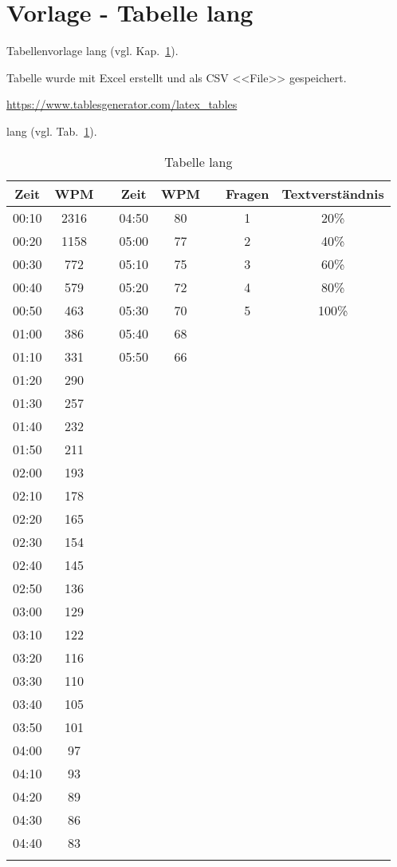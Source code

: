 ﻿\section{Vorlage - Tabelle lang}\label{sec:vorlage_tabelle_lang}

Tabellenvorlage lang (vgl. Kap.~\ref{sec:vorlage_tabelle_lang}).

Tabelle wurde mit Excel erstellt und als CSV <<File>> gespeichert.

\url{https://www.tablesgenerator.com/latex_tables}

lang (vgl. Tab.~\ref{tab:tabelle_lang}). 
\begin{longtable}[c]{cccccccc}
\hline
\textbf{Zeit} & \textbf{WPM} &  & \textbf{Zeit} & \textbf{WPM} &  & \textbf{Fragen} & \textbf{Textverständnis} \\ \hline
\endhead
%
\hline
\endfoot
%
\endlastfoot
%
00:10 & 2316 &  & 04:50 & 80 &  & 1 & 20\% \\
00:20 & 1158 &  & 05:00 & 77 &  & 2 & 40\% \\
00:30 & 772 &  & 05:10 & 75 &  & 3 & 60\% \\
00:40 & 579 &  & 05:20 & 72 &  & 4 & 80\% \\
00:50 & 463 &  & 05:30 & 70 &  & 5 & 100\% \\
01:00 & 386 &  & 05:40 & 68 &  &  &  \\
01:10 & 331 &  & 05:50 & 66 &  &  &  \\
01:20 & 290 &  &  &  &  &  &  \\
01:30 & 257 &  &  &  &  &  &  \\
01:40 & 232 &  &  &  &  &  &  \\
01:50 & 211 &  &  &  &  &  &  \\
02:00 & 193 &  &  &  &  &  &  \\
02:10 & 178 &  &  &  &  &  &  \\
02:20 & 165 &  &  &  &  &  &  \\
02:30 & 154 &  &  &  &  &  &  \\
02:40 & 145 &  &  &  &  &  &  \\
02:50 & 136 &  &  &  &  &  &  \\
03:00 & 129 &  &  &  &  &  &  \\
03:10 & 122 &  &  &  &  &  &  \\
03:20 & 116 &  &  &  &  &  &  \\
03:30 & 110 &  &  &  &  &  &  \\
03:40 & 105 &  &  &  &  &  &  \\
03:50 & 101 &  &  &  &  &  &  \\
04:00 & 97 &  &  &  &  &  &  \\
04:10 & 93 &  &  &  &  &  &  \\
04:20 & 89 &  &  &  &  &  &  \\
04:30 & 86 &  &  &  &  &  &  \\
04:40 & 83 &  &  &  &  &  &  \\ \hline
\caption{Tabelle lang}
\label{tab:tabelle_lang}\\
\end{longtable}